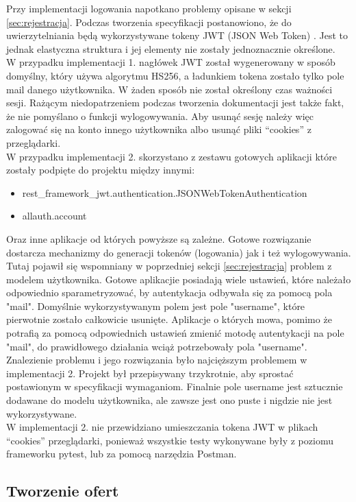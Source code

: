 \documentclass[12pt, notitlepage]{article}
\begin{document}
Przy implementacji logowania napotkano problemy opisane w sekcji \ref{sec:rejestracja}. Podczas tworzenia specyfikacji postanowiono, że do uwierzytelniania będą wykorzystywane tokeny JWT (JSON Web Token) \cite{jwt}. Jest to jednak elastyczna struktura i jej elementy nie zostały jednoznacznie określone. \\
W przypadku implementacji 1. nagłówek JWT został wygenerowany w sposób domyślny, który używa algorytmu HS256, a ładunkiem tokena zostało tylko pole mail danego użytkownika. W żaden sposób nie został określony czas ważności sesji. Rażącym niedopatrzeniem podczas tworzenia dokumentacji jest także fakt, że nie pomyślano o funkcji wylogowywania. Aby usunąć sesję należy więc zalogować się na konto innego użytkownika albo usunąć pliki ``cookies'' z przeglądarki.  \\
W przypadku implementacji 2. skorzystano z zestawu gotowych aplikacji które zostały podpięte do projektu między innymi: 
\begin{itemize}
    \item rest\_framework\_jwt.authentication.JSONWebTokenAuthentication
    \item allauth.account
\end{itemize}
Oraz inne aplikacje od których powyższe są zależne. Gotowe rozwiązanie dostarcza mechanizmy do generacji tokenów (logowania) jak i też wylogowywania. Tutaj pojawił się wspomniany w poprzedniej sekcji \ref{sec:rejestracja} problem z modelem użytkownika. Gotowe aplikacjie posiadają wiele ustawień, które należało odpowiednio sparametryzować, by autentykacja odbywała się za pomocą pola "mail". Domyślnie wykorzystywanym polem jest pole "username", które pierwotnie zostało całkowicie usunięte. Aplikacje o których mowa, pomimo że potrafią za pomocą odpowiednich ustawień zmienić motodę autentykacji na pole "mail", do prawidłowego działania wciąż potrzebowały pola "username". Znalezienie problemu i jego rozwiązania było najcięższym problemem w implementacji 2. Projekt był przepisywany trzykrotnie, aby sprostać postawionym w specyfikacji wymaganiom. Finalnie pole username jest sztucznie dodawane do modelu użytkownika, ale zawsze jest ono puste i nigdzie nie jest wykorzystywane.  \\
W implementacji 2. nie przewidziano umieszczania tokena JWT w plikach ``cookies'' przeglądarki, ponieważ wszystkie testy wykonywane były z poziomu frameworku pytest, lub za pomocą narzędzia Postman.

\subsection{Tworzenie ofert}
\end{document}
